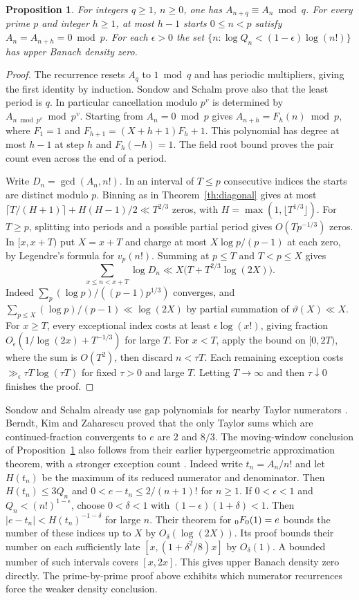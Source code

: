 \documentclass[11pt]{article}
\newtheorem{proposition}[theorem]{Proposition}
\begin{document}
\begin{proposition}\label{th:factorial}
For integers $q\ge1$, $n\ge0$, one has $A_{n+q}\equiv A_n\bmod q$.
For every prime $p$ and integer $h\ge1$, at most $h-1$ starts $0\le n<p$
satisfy $A_n=A_{n+h}=0\bmod p$. For each $\epsilon>0$ the set
$\{n:\log Q_n<(1-\epsilon)\log(n!)\}$ has upper Banach density zero.
\end{proposition}
\begin{proof}
The recurrence resets $A_q$ to $1\bmod q$ and has periodic multipliers,
giving the first identity by induction. Sondow and Schalm
\cite[Prop.~A.5]{sondow} prove also that the least period is $q$.
In particular cancellation modulo $p^v$ is determined by
$A_{n\bmod p^v}\bmod p^v$. Starting from $A_n=0\bmod p$ gives
$A_{n+h}=F_h(n)\bmod p$, where $F_1=1$ and
$F_{h+1}=(X+h+1)F_h+1$. This polynomial has degree at most $h-1$
at step $h$ and $F_h(-h)=1$. The field root bound proves the pair count
even across the end of a period.

Write $D_n=\gcd(A_n,n!)$. In an interval of $T\le p$ consecutive indices
the starts are distinct modulo $p$. Binning as in Theorem~\ref{th:diagonal}
gives at most $\lceil T/(H+1)\rceil+H(H-1)/2\ll T^{2/3}$ zeros, with
$H=\max(1,\lfloor T^{1/3}\rfloor)$. For $T\ge p$, splitting into periods
and a possible partial period gives $O(Tp^{-1/3})$ zeros. In $[x,x+T)$ put
$X=x+T$ and charge at most $X\log p/(p-1)$ at each zero, by Legendre's
formula for $v_p(n!)$. Summing at $p\le T$ and $T<p\le X$ gives
\[
 \sum_{x\le n<x+T}\log D_n\ll
 X\bigl(T+T^{2/3}\log(2X)\bigr).
\]
Indeed $\sum_p(\log p)/((p-1)p^{1/3})$ converges, and
$\sum_{p\le X}(\log p)/(p-1)\ll\log(2X)$ by partial summation of
$\vartheta(X)\ll X$. For $x\ge T$, every exceptional index costs at least
$\epsilon\log(x!)$, giving fraction $O_\epsilon(1/\log(2x)+T^{-1/3})$
for large $T$. For $x<T$, apply the bound on $[0,2T)$, where the sum
is $O(T^2)$, then discard $n<\tau T$. Each remaining exception costs
$\gg_\epsilon\tau T\log(\tau T)$ for fixed $\tau>0$ and large $T$.
Letting $T\to\infty$ and then $\tau\downarrow0$ finishes the proof.
\end{proof}
Sondow and Schalm already use gap polynomials for nearby Taylor numerators
\cite[\S3]{sondow}. Berndt, Kim and Zaharescu \cite{bkz} proved that the
only Taylor sums which are continued-fraction convergents to $e$ are $2$ and
$8/3$. The moving-window conclusion of Proposition~\ref{th:factorial} also follows
from their earlier hypergeometric approximation theorem, with a stronger
exception count \cite[Thm.~1.6 and the end of \S4]{bkzgeneral}.
Indeed write $t_n=A_n/n!$ and let $H(t_n)$ be the maximum of its reduced
numerator and denominator. Then $H(t_n)\le3Q_n$ and
$0<e-t_n\le2/(n+1)!$ for $n\ge1$. If $0<\epsilon<1$ and
$Q_n<(n!)^{1-\epsilon}$, choose $0<\delta<1$ with
$(1-\epsilon)(1+\delta)<1$. Then $|e-t_n|<H(t_n)^{-1-\delta}$ for large $n$.
Their theorem for $\mathstrut_0F_0(1)=e$ bounds the number of these indices up to
$X$ by $O_\delta(\log(2X))$. Its proof bounds their number on each sufficiently
late $[x,(1+\delta^2/8)x]$ by $O_\delta(1)$. A bounded number of such
intervals covers $[x,2x]$. This gives upper Banach density zero directly.
The prime-by-prime proof above exhibits which numerator recurrences force
the weaker density conclusion.
\end{document}

